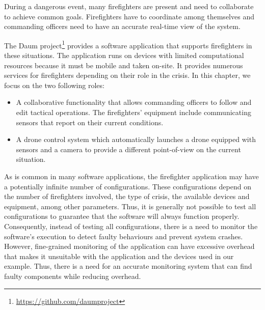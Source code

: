
During a dangerous event, many firefighters are present and need to collaborate to achieve common goals.
Firefighters have to coordinate among themselves and commanding officers need to have an accurate real-time view of the system.

The Daum project\footnote{\url{https://github.com/daumproject}} provides a software application that supports firefighters in these situations.
The application runs on devices with limited computational resources because it must be mobile and taken on-site.
It provides numerous services for firefighters depending on their role in the crisis.
In this chapter, we focus on the two following roles:
\begin{itemize}
\leftskip -.2in
 \item A collaborative functionality that allows commanding officers to follow and edit tactical operations. The firefighters' equipment include communicating sensors that report on their current conditions.
 \item A drone control system which automatically launches a drone equipped with sensors and a camera to provide a different point-of-view on the current situation.
\end{itemize}


As is common in many software applications, the firefighter application may have a potentially infinite number of configurations. These configurations depend on the number of firefighters involved, the type of crisis, the available devices and equipment, among other parameters. 
Thus, it is generally not possible to test all configurations to guarantee that the software will always function properly. 
Consequently, instead of testing all configurations, there is a need to monitor the software's execution to detect faulty behaviours and prevent system crashes. 
However, fine-grained monitoring of the application can have excessive overhead that makes it unsuitable with the application and the devices used in our example.
Thus, there is a need for an accurate monitoring system that can find faulty components while reducing overhead.

